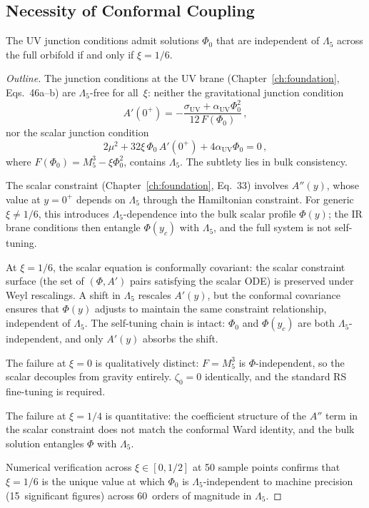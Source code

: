 \subsection{Necessity of Conformal Coupling}
\label{sec:3-vnogo-xi}

\begin{proposition}[Necessity of $\xi = 1/6$]
\label{thm:vnogo-xi}
The UV junction conditions admit solutions $\Phi_0$ that are independent of $\Lambda_5$ across the full orbifold if and only if $\xi = 1/6$.
\end{proposition}

\begin{proof}[Outline]
The junction conditions at the UV brane (Chapter~\ref{ch:foundation}, Eqs.~46a--b) are $\Lambda_5$-free for all~$\xi$: neither the gravitational junction condition
\begin{equation}
  A'(0^+) = -\frac{\sigma_{\mathrm{UV}} + \alpha_{\mathrm{UV}}\Phi_0^2}{12\,F(\Phi_0)}\,,
  \label{eq:3-jc-grav}
\end{equation}
nor the scalar junction condition
\begin{equation}
  2\mu^2 + 32\xi\,\Phi_0\,A'(0^+) + 4\alpha_{\mathrm{UV}}\Phi_0 = 0\,,
  \label{eq:3-jc-scalar}
\end{equation}
where $F(\Phi_0) = M_5^3 - \xi\Phi_0^2$, contains $\Lambda_5$. The subtlety lies in bulk consistency.

The scalar constraint (Chapter~\ref{ch:foundation}, Eq.~33) involves $A''(y)$, whose value at $y = 0^+$ depends on $\Lambda_5$ through the Hamiltonian constraint. For generic $\xi \neq 1/6$, this introduces $\Lambda_5$-dependence into the bulk scalar profile $\Phi(y)$; the IR brane conditions then entangle $\Phi(y_c)$ with $\Lambda_5$, and the full system is not self-tuning.

At $\xi = 1/6$, the scalar equation is conformally covariant: the scalar constraint surface (the set of $(\Phi, A')$ pairs satisfying the scalar ODE) is preserved under Weyl rescalings. A shift in $\Lambda_5$ rescales $A'(y)$, but the conformal covariance ensures that $\Phi(y)$ adjusts to maintain the same constraint relationship, independent of $\Lambda_5$. The self-tuning chain is intact: $\Phi_0$ and $\Phi(y_c)$ are both $\Lambda_5$-independent, and only $A'(y)$ absorbs the shift.

The failure at $\xi = 0$ is qualitatively distinct: $F = M_5^3$ is $\Phi$-independent, so the scalar decouples from gravity entirely. $\zeta_0 = 0$ identically, and the standard RS fine-tuning is required.

The failure at $\xi = 1/4$ is quantitative: the coefficient structure of the $A''$ term in the scalar constraint does not match the conformal Ward identity, and the bulk solution entangles $\Phi$ with $\Lambda_5$.

Numerical verification across $\xi \in [0, 1/2]$ at 50 sample points confirms that $\xi = 1/6$ is the unique value at which $\Phi_0$ is $\Lambda_5$-independent to machine precision (15~significant figures) across 60~orders of magnitude in $\Lambda_5$.
\end{proof}

